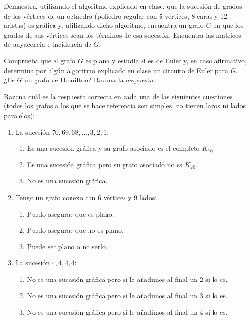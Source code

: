 \begin{ejercicio}\label{ej:1.30}
    Demuestra, utilizando el algoritmo explicado en clase, que la sucesión de grados de los vértices de un octaedro (poliedro regular con 6 vértices, 8 caras y 12 aristas) es gráfica y, utilizando dicho algoritmo, encuentra un grafo $G$ en que los grados de sus vértices sean los términos de esa sucesión. Encuentra las matrices de adyacencia e incidencia de $G$.
    
    Comprueba que el grafo $G$ es plano y estudia si es de Euler y, en caso afirmativo, determina por algún algoritmo explicado en clase un circuito de Euler para $G$. ¿Es $G$ un grafo de Hamilton? Razona la respuesta.
\end{ejercicio}


\begin{ejercicio}\label{ej:1.31}
    Razona cuál es la respuesta correcta en cada una de las siguientes cuestiones (todos los grafos a los que se hace referencia son simples, no tienen lazos ni lados paralelos):
    \begin{enumerate}
        \item La sucesión $70, 69, 68, \ldots, 3, 2, 1$.
        \begin{enumerate}
            \item Es una sucesión gráfica y su grafo asociado es el completo $K_{70}$.
            \item Es una sucesión gráfica pero su grafo asociado no es $K_{70}$.
            \item No es una sucesión gráfica.
        \end{enumerate}
        \item Tengo un grafo conexo con 6 vértices y 9 lados:
        \begin{enumerate}
            \item Puedo asegurar que es plano.
            \item Puedo asegurar que no es plano.
            \item Puede ser plano o no serlo.
        \end{enumerate}
        \item La sucesión $4, 4, 4, 4$:
        \begin{enumerate}
            \item No es una sucesión gráfica pero si le añadimos al final un 2 si lo es.
            \item No es una sucesión gráfica pero si le añadimos al final un 3 si lo es.
            \item No es una sucesión gráfica pero si le añadimos al final un 4 si lo es.

\end{enumerate}
\end{enumerate}
\end{ejercicio}
